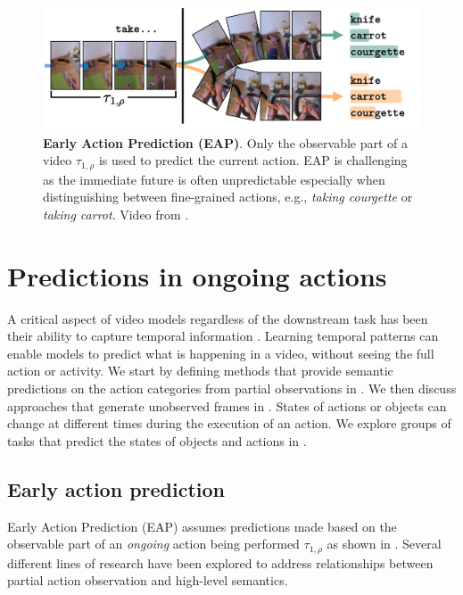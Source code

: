 \begin{figure}[t]
    \centering
    \includegraphics[width=\linewidth]{figs/EAP.pdf}
    \caption{\textbf{Early Action Prediction (EAP)}. Only the observable part of a video $\tau_{1,\rho}$ is used to predict the current action. EAP is challenging as the immediate future is often unpredictable especially when distinguishing between fine-grained actions, e.g., \textit{taking courgette} or \textit{taking carrot}. Video from .}
    \label{fig:EAP_overview}
\end{figure}

\section{Predictions in ongoing actions}
\label{sec:prediction}

A critical aspect of video models regardless of the downstream task has been their ability to capture temporal information . Learning temporal patterns can enable models to predict what is happening in a video, without seeing the full action or activity. We start by defining methods that provide semantic predictions on the action categories from partial observations in . We then discuss approaches that generate unobserved frames in . States of actions or objects can change at different times during the execution of an action. We explore groups of tasks that predict the states of objects and actions in . 



\subsection{Early action prediction}
\label{sec:prediction::EAP}

Early Action Prediction (EAP) assumes predictions made based on the observable part of an \emph{ongoing} action being performed $\tau_{1,\rho}$ as shown in . 
Several different lines of research have been explored to address relationships between partial action observation and high-level semantics.

